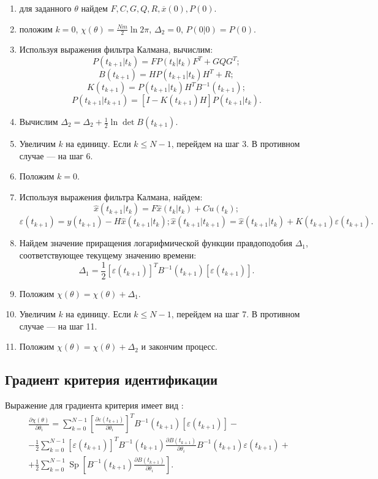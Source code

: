 \documentclass[a4paper,14pt]{extarticle}
\DeclareMathOperator{\Sp}{Sp}
\renewcommand{\vec}[1]{#1}
\newcommand{\eps}{\varepsilon}
\begin{document}
\begin{enumerate}
\item для заданного $\theta$  найдем $F, C, G, Q, R, \overline{\vec{x}}(0),
P(0)$.
\item положим $k = 0$, $\chi(\theta) = \frac{Nm}{2} \ln{2\pi}$, $\Delta_2 = 0$,
$P(0|0) = P(0)$.
\item Используя выражения фильтра Калмана, вычислим:
\[
	P(t_{k+1}|t_k) = F P(t_k|t_k) F^T + GQG^T;
\]
\[
	B(t_{k+1}) = H P(t_{k+1}|t_k) H^T + R;
\]
\[
	K(t_{k+1}) = P(t_{k+1}|t_k) H^T B^{-1}(t_{k+1});
\]
\[
	P(t_{k+1}|t_{k+1}) = \left[ I - K(t_{k+1}) H \right] P(t_{k+1}|t_k).
\]
\item Вычислим $\Delta_2 = \Delta_2 + \frac{1}{2} \ln \det B(t_{k+1})$.
\item Увеличим $k$ на единицу. Если $k \le N-1$, перейдем на шаг 3. В противном
случае --- на шаг 6.
\item Положим $k = 0$.
\item Используя выражения фильтра Калмана, найдем:
\[
	\hat{x}(t_{k+1}|t_k) = F \hat{x}(t_k|t_k) + C u(t_k);
\]
\[
	\eps(t_{k+1}) = y(t_{k+1}) - H \hat{x} (t_{k+1}|t_k);
	\hat{x}(t_{k+1}|t_{k+1}) = \hat{x}(t_{k+1}|t_k) + K(t_{k+1}) \eps(t_{k+1}).
\]
\item Найдем значение приращения логарифмической функции правдоподобия
$\Delta_1$, соответствующее текущему значению времени:
\[
	\Delta_1 = \frac{1}{2} \left[ \eps(t_{k+1}) \right]^T B^{-1}(t_{k+1}) 
	\left[ \eps(t_{k+1}) \right].
\]
\item Положим $\chi(\theta) = \chi(\theta) + \Delta_1$.
\item Увеличим $k$ на единицу. Если $k \le N-1$, перейдем на шаг 7.
В противном случае --- на шаг 11.
\item Положим $\chi(\theta) = \chi(\theta) + \Delta_2$ и закончим процесс.
\end{enumerate}

\subsection{Градиент критерия идентификации}

Выражение для градиента критерия имеет вид \cite{mono}:
\begin{equation*}
\begin{split}
	\frac{\partial \chi(\theta)}{\partial \theta_i} = \sum\limits_{k=0}^{N-1}
	\left[ \frac{\partial \eps(t_{k+1})}{\partial \theta_i} \right]^T
	B^{-1}(t_{k+1}) \left[ \eps(t_{k+1}) \right] - \\
	- \frac{1}{2}
	\sum\limits_{k=0}^{N-1} \left[ \eps(t_{k+1}) \right]^T B^{-1}(t_{k+1})
	\frac{\partial B(t_{k+1})}{\partial \theta_i} B^{-1}(t_{k+1}) \eps(t_{k+1}) +
	\\ + 
	\frac{1}{2} \sum\limits_{k=0}^{N-1} \Sp \left[ B^{-1}(t_{k+1})
	\frac{\partial B(t_{k+1})}{\partial \theta_i} \right]. 
\end{split}
\end{equation*}
\end{document}
